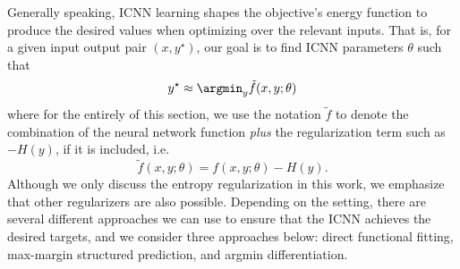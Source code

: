 




Generally speaking, ICNN learning shapes the objective's energy function to
produce the desired values when optimizing over the relevant inputs.  That is,
for a given input output pair $(x,y^\star)$, our goal is to find ICNN parameters
$\theta$ such that
\begin{equation}
y^\star \approx \argmin_y \tilde{f}(x,y;\theta)
\end{equation}
where for the entirely of this section, we use the notation $\tilde{f}$ to
denote the combination of the neural network function \emph{plus} the
regularization term such as $-H(y)$, if it is included, i.e.
\begin{equation}
\tilde{f}(x,y;\theta) = f(x,y;\theta) - H(y).
\end{equation}
Although we only discuss the entropy regularization in this work, we emphasize
that other regularizers are also possible. Depending on the setting, there are
several different approaches we can use
to ensure that the ICNN achieves the desired targets, and we consider three
approaches below: direct functional fitting,
max-margin structured prediction, and argmin differentiation.


